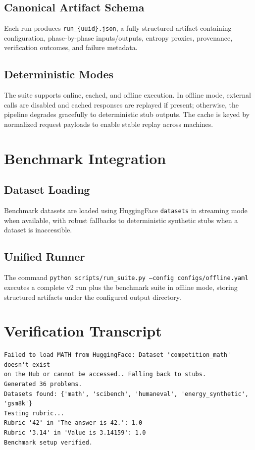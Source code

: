 \documentclass[11pt]{article}
\begin{document}
\subsection{Canonical Artifact Schema}
Each run produces \texttt{run\_\{uuid\}.json}, a fully structured artifact containing configuration, phase-by-phase inputs/outputs, entropy proxies, provenance, verification outcomes, and failure metadata.

\subsection{Deterministic Modes}
The suite supports online, cached, and offline execution. In offline mode, external calls are disabled and cached responses are replayed if present; otherwise, the pipeline degrades gracefully to deterministic stub outputs. The cache is keyed by normalized request payloads to enable stable replay across machines.

\section{Benchmark Integration}
\subsection{Dataset Loading}
Benchmark datasets are loaded using HuggingFace \texttt{datasets} in streaming mode when available, with robust fallbacks to deterministic synthetic stubs when a dataset is inaccessible.

\subsection{Unified Runner}
The command \texttt{python scripts/run\_suite.py --config configs/offline.yaml} executes a complete v2 run plus the benchmark suite in offline mode, storing structured artifacts under the configured output directory.

\section{Verification Transcript}
\begin{verbatim}
Failed to load MATH from HuggingFace: Dataset 'competition_math' doesn't exist
on the Hub or cannot be accessed.. Falling back to stubs.
Generated 36 problems.
Datasets found: {'math', 'scibench', 'humaneval', 'energy_synthetic', 'gsm8k'}
Testing rubric...
Rubric '42' in 'The answer is 42.': 1.0
Rubric '3.14' in 'Value is 3.14159': 1.0
Benchmark setup verified.
\end{verbatim}
\end{document}

